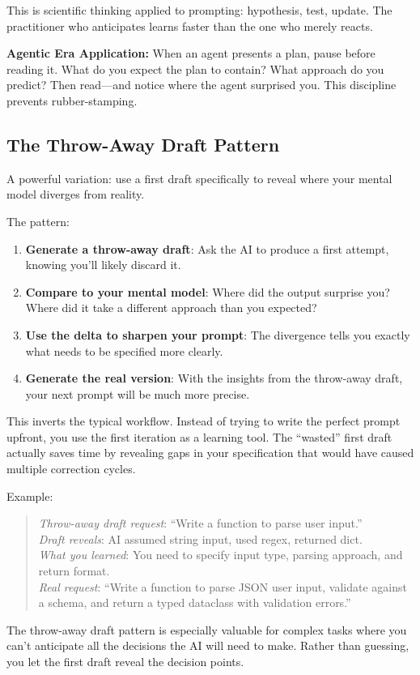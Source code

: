 This is scientific thinking applied to prompting: hypothesis, test, update. The practitioner who anticipates learns faster than the one who merely reacts.

\begin{quotebox}
\textbf{Agentic Era Application:} When an agent presents a plan, pause before reading it. What do you expect the plan to contain? What approach do you predict? Then read---and notice where the agent surprised you. This discipline prevents rubber-stamping.
\end{quotebox}

\subsection{The Throw-Away Draft Pattern}

A powerful variation: use a first draft specifically to reveal where your mental model diverges from reality.

The pattern:
\begin{enumerate}
    \item \textbf{Generate a throw-away draft}: Ask the AI to produce a first attempt, knowing you'll likely discard it.
    \item \textbf{Compare to your mental model}: Where did the output surprise you? Where did it take a different approach than you expected?
    \item \textbf{Use the delta to sharpen your prompt}: The divergence tells you exactly what needs to be specified more clearly.
    \item \textbf{Generate the real version}: With the insights from the throw-away draft, your next prompt will be much more precise.
\end{enumerate}

This inverts the typical workflow. Instead of trying to write the perfect prompt upfront, you use the first iteration as a learning tool. The ``wasted'' first draft actually saves time by revealing gaps in your specification that would have caused multiple correction cycles.

Example:
\begin{quote}
\emph{Throw-away draft request}: ``Write a function to parse user input.''\\
\emph{Draft reveals}: AI assumed string input, used regex, returned dict.\\
\emph{What you learned}: You need to specify input type, parsing approach, and return format.\\
\emph{Real request}: ``Write a function to parse JSON user input, validate against a schema, and return a typed dataclass with validation errors.''
\end{quote}

The throw-away draft pattern is especially valuable for complex tasks where you can't anticipate all the decisions the AI will need to make. Rather than guessing, you let the first draft reveal the decision points.
